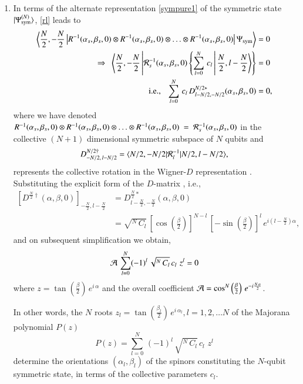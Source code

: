 {\begin{enumerate}
\item In terms of the alternate representation \eqref{sympure1} of the symmetric state $\vert \Psi^{(N)}_{\rm sym}\rangle$, \eqref{rl} leads to 
{\fontsize{8pt}{10pt}\selectfont
\begin{align}
\left\langle \frac{N}{2},-\frac{N}{2}\left\vert R^{-1}(\alpha_s,\beta_s,0)\otimes R^{-1}(\alpha_s,\beta_s,0)\otimes \ldots  \otimes R^{-1}(\alpha_s,\beta_s,0) \right \vert \Psi_{\rm sym}\right\rangle&=0\nonumber \\ 
\Rightarrow\ \ \left\langle \frac{N}{2},-\frac{N}{2}\left \vert {\cal R}_s^{-1}(\alpha_s,\beta_s,0) \left\{\sum_{l=0}^N\, c_l\, \right \vert \frac{N}{2},l-\frac{N}{2}\right \rangle\right\}&=0 \nonumber \\
{\rm i.e.,} \ \ \ \sum_{l=0}^N\, c_l\, D^{N/2*}_{l-N/2,-N/2}(\alpha_s,\beta_s,0) &=0, \label{prelim}
\end{align}}\relax
where we have denoted $R^{-1}(\alpha_s,\beta_s,0)\otimes R^{-1}(\alpha_s,\beta_s,0)\otimes \ldots  \otimes R^{-1}(\alpha_s,\beta_s,0)~=~{\cal R}^{-1}_s(\alpha_s,\beta_s,0)$ in the collective $(N+1)$ dimensional symmetric subspace of $N$ qubits and 
$$
D^{N/2\dag}_{-N/2,\, l-N/2}=\langle N/2,-N/2\vert{\cal R}^{-1}_l \vert N/2,l-N/2\rangle,
$$
represents the collective rotation in the Wigner-$D$ representation \cite{Rose}. Substituting the explicit form of the $D$-matrix \cite{Rose}, i.e.,
{\fontsize{9pt}{11pt}\selectfont
\begin{align}
\left[D^{\frac{N}{2}\dag}(\alpha,\beta,0)\right]_{-\frac{N}{2},l-\frac{N}{2}}&= D^{\frac{N}{2}*}_{l-\frac{N}{2},-\frac{N}{2}}(\alpha,\beta,0) \nonumber\\ 
&=  \sqrt{^N\,C_l}\, \left[\cos\left(\frac{\beta}{2}\right)\right]^{N-l}\, \left[-\sin\left(\frac{\beta}{2}\right)\right]^{l} \, e^{i(l-\frac{N}{2})\alpha},\label{dmatrix}
\end{align}}\relax
and on subsequent simplification we obtain,
\begin{equation}
{\cal A}\, \sum_{l=0}^N (-1)^l\,\sqrt{^N\, C_l}\,  c_l\,  \, z^{l}=0  \label{cmj02}
\end{equation} 
where $z=\tan\left(\frac{\beta}{2}\right)\,e^{i\, \alpha}$ and the overall coefficient ${\cal A}=\cos^N\left(\frac{\beta}{2}\right)\,e^{-i\frac{N\,\alpha}{2}}$. 

In other words, the $N$ roots $z_l=\tan\left(\frac{\beta_l}{2}\right)\,e^{i\, \alpha_l}, l=1,2,\ldots N$ of the Majorana polynomial $P(z)$
\begin{equation} 
P(z)=\sum_{l=0}^N\, (-1)^l\, \sqrt{^N\, C_l}\,  c_l\,  \, z^{l}\label{Mp}
\end{equation}
determine the orientations $(\alpha_l,\beta_l)$ of the  spinors constituting the  $N$-qubit symmetric state, in terms of the collective parameters $c_l$.
\end{enumerate}

}
